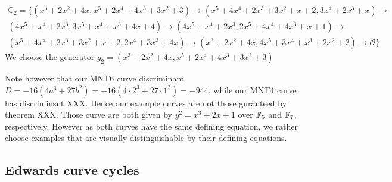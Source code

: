\begin{multline*}
\mathbb{G}_2=\{ 
(x^3+2x^2+4x,x^5+2x^4+4x^3+3x^2+3)\to
(x^5+4x^4+2x^3+3x^2+x+2,3x^4+2x^3+x)\to\\
(4x^5+x^4+2x^3,3x^5+x^4+x^3+4x+4)\to
(4x^5+x^4+2x^3,2x^5+4x^4+4x^3+x+1) \to\\
(x^5+4x^4+2x^3+3x^2+x+2,2x^4+3x^3+4x)\to
(x^3+2x^2+4x,4x^5+3x^4+x^3+2x^2+2)\to
\mathcal{O}\}
\end{multline*}
We choose the generator $g_2 = (x^3+2x^2+4x,x^5+2x^4+4x^3+3x^2+3)$

\begin{remark}
Note however that our MNT6 curve discriminant $D=-16(4a^3 + 27 b^2)= -16(4\cdot 2^3 + 27\cdot 1^2)=-944$, while our MNT4 curve has discriminsnt XXX. Hence our example curves are not those guranteed by theorem XXX. Those curve are both given by $y^2= x^3 + 2x +1$ over $\mathbb{F}_5$ and $\mathbb{F}_7$, respectively. However as both curves have the same defining equation, we rather choose examples that are visually distinguishable by their defining equations.
\end{remark}

\subsection{Edwards curve cycles}
